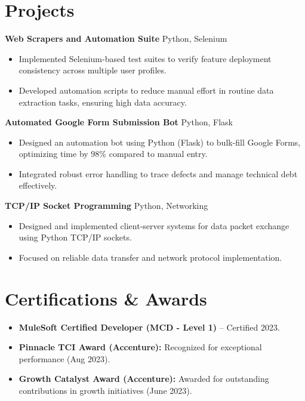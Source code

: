 \documentclass[letterpaper,10pt]{article}
\begin{document}
\section*{Projects}
\textbf{Web Scrapers and Automation Suite} \hfill Python, Selenium \\
\begin{itemize}
    \item Implemented Selenium-based test suites to verify feature deployment consistency across multiple user profiles.
    \item Developed automation scripts to reduce manual effort in routine data extraction tasks, ensuring high data accuracy.
\end{itemize}

\textbf{Automated Google Form Submission Bot} \hfill Python, Flask \\
\begin{itemize}
    \item Designed an automation bot using Python (Flask) to bulk-fill Google Forms, optimizing time by 98\% compared to manual entry.
    \item Integrated robust error handling to trace defects and manage technical debt effectively.
\end{itemize}

\textbf{TCP/IP Socket Programming} \hfill Python, Networking \\
\begin{itemize}
    \item Designed and implemented client-server systems for data packet exchange using Python TCP/IP sockets.
    \item Focused on reliable data transfer and network protocol implementation.
\end{itemize}



\section*{Certifications \& Awards}
\begin{itemize} \itemsep -2pt
    \item \textbf{MuleSoft Certified Developer (MCD - Level 1)} -- Certified 2023.
    \item \textbf{Pinnacle TCI Award (Accenture):} Recognized for exceptional performance (Aug 2023).
    \item \textbf{Growth Catalyst Award (Accenture):} Awarded for outstanding contributions in growth initiatives (June 2023).
\end{itemize}
\end{document}
